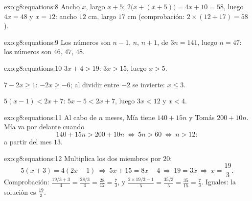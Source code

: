 \begin{solution}{exo:g8:equations:8}
Ancho $x$, largo $x + 5$; 
$2\bigl(x + (x + 5)\bigr) = 4x + 10 = 58$, luego $4x = 48$ y $x = 12$:
ancho $12$ cm, largo $17$ cm (comprobación:
$2 \times (12 + 17) = 58$).
\end{solution}

\begin{solution}{exo:g8:equations:9}
Los números son $n - 1$, $n$, $n + 1$, de  $3n = 141$, luego
$n = 47$: los números son $46$, $47$, $48$.
\end{solution}

\begin{solution}{exo:g8:equations:10}
$3x + 4 > 19$: $3x > 15$, luego $x > 5$.

$7 - 2x \geq 1$: $-2x \geq -6$; al dividir entre $-2$ se invierte:
$x \leq 3$.

$5(x-1) < 2x + 7$: $5x - 5 < 2x + 7$, luego $3x < 12$ y $x < 4$.
\end{solution}

\begin{solution}{exo:g8:equations:11}
Al cabo de $n$ meses, Mía tiene $140 + 15n$ y Tomás $200 + 10n$. Mía
va por delante cuando
\[
140 + 15n > 200 + 10n
\ \Longleftrightarrow\
5n > 60
\ \Longleftrightarrow\
n > 12 :
\]
a partir del mes $13$.
\end{solution}

\begin{solution}{exo:g8:equations:12}
Multiplica los dos miembros por $20$:
\[
5(x + 3) = 4(2x - 1)
\ \Longrightarrow\
5x + 15 = 8x - 4
\ \Longrightarrow\
19 = 3x
\ \Longrightarrow\
x = \frac{19}{3}.
\]
Comprobación: $\frac{19/3 + 3}{4} = \frac{28/3}{4} = \frac{28}{12} =
\frac73$, y $\frac{2 \times 19/3 - 1}{5} = \frac{35/3}{5} =
\frac{35}{15} = \frac73$. Iguales: la solución es $\frac{19}{3}$.
\end{solution}

